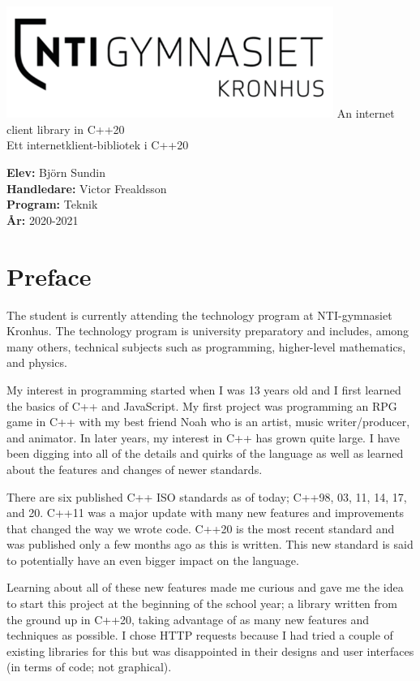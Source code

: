 \documentclass[12pt, a4paper]{article}
\begin{document}
\begin{titlepage}
	\begin{center} 
		\includegraphics[width=0.8\textwidth]{nti_kronhus}
		\vfill 
		\Huge
		An internet client library in C++20\vspace{1.5em}\\
		Ett internetklient-bibliotek i C++20
	\end{center}
	\vfill 
	\textbf{Elev: }Björn Sundin\\
	\textbf{Handledare: }Victor Frealdsson\\
	\textbf{Program: }Teknik\\
	\textbf{År: }2020-2021
\end{titlepage}

\section*{Preface}
The student is currently attending the technology program at NTI-gymnasiet Kronhus. The technology program is university preparatory and includes, among many others, technical subjects such as programming, higher-level mathematics, and physics.

My interest in programming started when I was 13 years old and I first learned the basics of C++ and JavaScript. My first project was programming an RPG game in C++ with my best friend Noah who is an artist, music writer/producer, and animator. In later years, my interest in C++ has grown quite large. I have been digging into all of the details and quirks of the language as well as learned about the features and changes of newer standards.

There are six published C++ ISO standards as of today; C++98, 03, 11, 14, 17, and 20. C++11 was a major update with many new features and improvements that changed the way we wrote code. C++20 is the most recent standard and was published only a few months ago as this is written. This new standard is said to potentially have an even bigger impact on the language. 

Learning about all of these new features made me curious and gave me the idea to start this project at the beginning of the school year; a library written from the ground up in C++20, taking advantage of as many new features and techniques as possible. I chose HTTP requests because I had tried a couple of existing libraries for this but was disappointed in their designs and user interfaces (in terms of code; not graphical).
\end{document}
